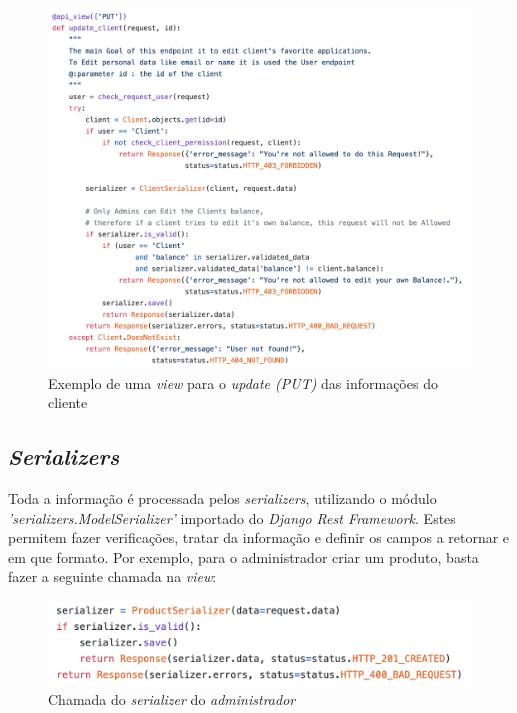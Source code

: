 \documentclass[10pt,english]{article}
\begin{document}
\begin{figure}[!h]
        \centering
        \includegraphics[width=\textwidth]{images/clientupdate.png}
        \caption{Exemplo de uma \textit{view} para o \textit{update (PUT)} das informações do cliente}
\end{figure}

\newpage

\subsection{\textit{Serializers}}

\par Toda a informação é processada pelos \textit{serializers}, utilizando o módulo \textit{'serializers.ModelSerializer'} importado do \textit{Django Rest Framework}. Estes permitem fazer verificações, tratar da informação e definir os campos a retornar e em que formato. Por exemplo, para o administrador criar um produto, basta fazer a seguinte chamada na \textit{view}:

\begin{figure}[!h]
        \centering
        \includegraphics[width=\textwidth]{images/create_product.png}
        \caption{Chamada do \textit{serializer} do \textit{administrador}}
\end{figure}
\end{document}
